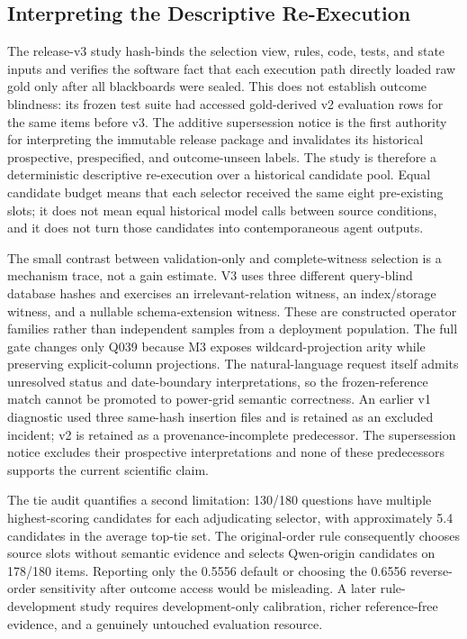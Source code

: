 \documentclass[applsci,article,submit,moreauthors]{Definitions/mdpi}
\begin{document}
\subsection{Interpreting the Descriptive Re-Execution}

The release-v3 study hash-binds the selection view, rules, code, tests, and state inputs and verifies the software fact that each execution path directly loaded raw gold only after all blackboards were sealed. This does not establish outcome blindness: its frozen test suite had accessed gold-derived v2 evaluation rows for the same items before v3. The additive supersession notice is the first authority for interpreting the immutable release package and invalidates its historical prospective, prespecified, and outcome-unseen labels. The study is therefore a deterministic descriptive re-execution over a historical candidate pool. Equal candidate budget means that each selector received the same eight pre-existing slots; it does not mean equal historical model calls between source conditions, and it does not turn those candidates into contemporaneous agent outputs.

The small contrast between validation-only and complete-witness selection is a mechanism trace, not a gain estimate. V3 uses three different query-blind database hashes and exercises an irrelevant-relation witness, an index/storage witness, and a nullable schema-extension witness. These are constructed operator families rather than independent samples from a deployment population. The full gate changes only Q039 because M3 exposes wildcard-projection arity while preserving explicit-column projections. The natural-language request itself admits unresolved status and date-boundary interpretations, so the frozen-reference match cannot be promoted to power-grid semantic correctness. An earlier v1 diagnostic used three same-hash insertion files and is retained as an excluded incident; v2 is retained as a provenance-incomplete predecessor. The supersession notice excludes their prospective interpretations and none of these predecessors supports the current scientific claim.

The tie audit quantifies a second limitation: 130/180 questions have multiple highest-scoring candidates for each adjudicating selector, with approximately 5.4 candidates in the average top-tie set. The original-order rule consequently chooses source slots without semantic evidence and selects Qwen-origin candidates on 178/180 items. Reporting only the 0.5556 default or choosing the 0.6556 reverse-order sensitivity after outcome access would be misleading. A later rule-development study requires development-only calibration, richer reference-free evidence, and a genuinely untouched evaluation resource.
\end{document}
